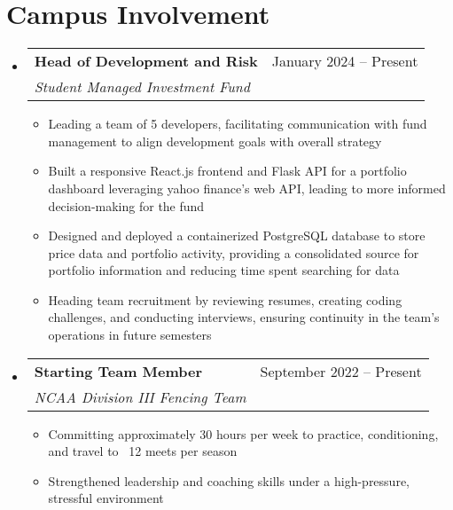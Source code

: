 \documentclass[letterpaper,11pt]{article}
\makeatletter
\newcommand{\resumeItem}[1]{
  \item\small{
    {#1 \vspace{-2pt}}
  }
}
\newcommand{\resumeSubheading}[4]{
  \vspace{-2pt}\item
    \begin{tabular*}{0.97\textwidth}[t]{l@{\extracolsep{\fill}}r}
      \textbf{#1} & #2 \\
      \textit{\small#3} & \textit{\small #4} \\
    \end{tabular*}\vspace{-7pt}
}
\newcommand{\resumeSubSubheading}[2]{
    \item
    \begin{tabular*}{0.97\textwidth}{l@{\extracolsep{\fill}}r}
      \textit{\small#1} & \textit{\small #2} \\
    \end{tabular*}\vspace{-7pt}
}
\newcommand{\resumeSubHeadingListStart}{\begin{itemize}[leftmargin=0.15in, label={}]}
\newcommand{\resumeSubHeadingListEnd}{\end{itemize}}
\newcommand{\resumeItemListStart}{\begin{itemize}}
\newcommand{\resumeItemListEnd}{\end{itemize}\vspace{-5pt}}
\makeatother
\begin{document}

\section{Campus Involvement}
  \resumeSubHeadingListStart

    \resumeSubheading{Head of Development and Risk}{January 2024 -- Present}{Student Managed Investment Fund}{\empty}
    \resumeItemListStart
      \resumeItem{Leading a team of 5 developers, facilitating communication with fund management to align development goals with overall strategy}
      \resumeItem{Built a responsive React.js frontend and Flask API for a portfolio dashboard leveraging yahoo finance’s web API, leading to more informed decision-making for the fund}
      \resumeItem{Designed and deployed a containerized PostgreSQL database to store price data and portfolio activity, providing a consolidated source for portfolio information and reducing time spent searching for data}
      \resumeItem{Heading team recruitment by reviewing resumes, creating coding challenges, and conducting interviews, ensuring continuity in the team’s operations in future semesters}
    \resumeItemListEnd
    \resumeSubheading{Starting Team Member}{September 2022 -- Present}{NCAA Division III Fencing Team}{\empty}
    \resumeItemListStart
      \resumeItem{Committing approximately 30 hours per week to practice, conditioning, and travel to ~12 meets per season}
      \resumeItem{Strengthened leadership and coaching skills under a high-pressure, stressful environment}
    \resumeItemListEnd
  \resumeSubHeadingListEnd

\end{document}
